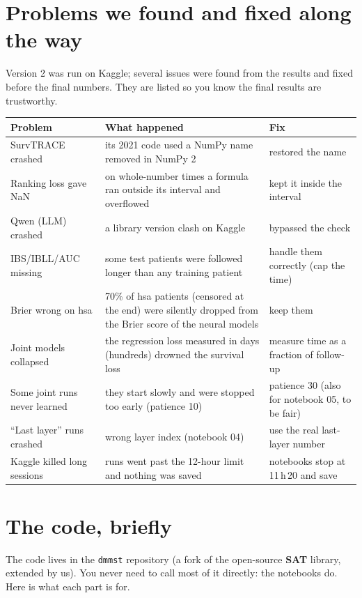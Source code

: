 \documentclass[11pt]{article}
\begin{document}
\section{Problems we found and fixed along the way}\label{sec:fixes}
Version 2 was run on Kaggle; several issues were found from the results and fixed before the final
numbers. They are listed so you know the final results are trustworthy.

\begin{table}[H]
\centering
\small
\begin{tabularx}{\textwidth}{lYY}
\toprule
Problem & What happened & Fix \\
\midrule
SurvTRACE crashed & its 2021 code used a NumPy name removed in NumPy 2 & restored the name \\
Ranking loss gave NaN & on whole-number times a formula ran outside its interval and overflowed & kept it
  inside the interval \\
Qwen (LLM) crashed & a library version clash on Kaggle & bypassed the check \\
IBS/IBLL/AUC missing & some test patients were followed longer than any training patient & handle them
  correctly (cap the time) \\
Brier wrong on hsa & 70\% of hsa patients (censored at the end) were silently dropped from the Brier
  score of the neural models & keep them \\
Joint models collapsed & the regression loss measured in days (hundreds) drowned the survival loss &
  measure time as a fraction of follow-up \\
Some joint runs never learned & they start slowly and were stopped too early (patience 10) & patience 30
  (also for notebook 05, to be fair) \\
``Last layer'' runs crashed & wrong layer index (notebook 04) & use the real last-layer number \\
Kaggle killed long sessions & runs went past the 12-hour limit and nothing was saved & notebooks stop at
  11\,h\,20 and save \\
\bottomrule
\end{tabularx}
\end{table}

\section{The code, briefly}
The code lives in the \texttt{dmmst} repository (a fork of the open-source \textbf{SAT} library,
extended by us). You never need to call most of it directly: the notebooks do. Here is what each part
is for.
\end{document}
